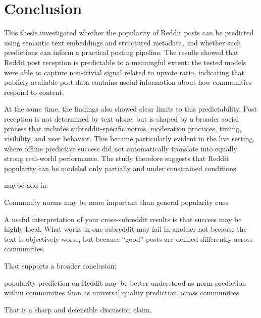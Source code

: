 \chapter{Conclusion}

This thesis investigated whether the popularity of Reddit posts can be predicted using semantic text embeddings and structured metadata, and whether such predictions can inform a practical posting pipeline. The results showed that Reddit post reception is predictable to a meaningful extent: the tested models were able to capture non-trivial signal related to upvote ratio, indicating that publicly available post data contains useful information about how communities respond to content.

At the same time, the findings also showed clear limits to this predictability. Post reception is not determined by text alone, but is shaped by a broader social process that includes subreddit-specific norms, moderation practices, timing, visibility, and user behavior. This became particularly evident in the live setting, where offline predictive success did not automatically translate into equally strong real-world performance. The study therefore suggests that Reddit popularity can be modeled only partially and under constrained conditions.




maybe add in:


Community norms may be more important than general popularity cues

A useful interpretation of your cross-subreddit results is that success may be highly local. What works in one subreddit may fail in another not because the text is objectively worse, but because “good” posts are defined differently across communities.

That supports a broader conclusion:

popularity prediction on Reddit may be better understood as norm prediction within communities than as universal quality prediction across communities

That is a sharp and defensible discussion claim.
